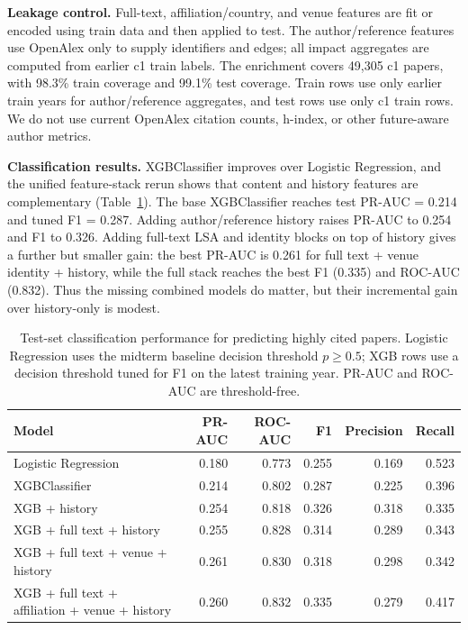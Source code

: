 \textbf{Leakage control.} Full-text, affiliation/country, and venue features
are fit or encoded using train data and then applied to test. The
author/reference features use OpenAlex only to supply identifiers and edges;
all impact aggregates are computed from earlier c1 train labels. The
enrichment covers 49{,}305 c1 papers, with 98.3\% train coverage and 99.1\%
test coverage. Train rows use only earlier train years for author/reference
aggregates, and test rows use only c1 train rows. We do not use current
OpenAlex citation counts, h-index, or other future-aware author metrics.

\textbf{Classification results.} XGBClassifier improves over Logistic
Regression, and the unified feature-stack rerun shows that content and history
features are complementary (Table~\ref{tab:final-xgb-classification}). The
base XGBClassifier reaches test PR-AUC = 0.214 and tuned F1 = 0.287. Adding
author/reference history raises PR-AUC to 0.254 and F1 to 0.326. Adding
full-text LSA and identity blocks on top of history gives a further but
smaller gain: the best PR-AUC is 0.261 for full text + venue identity +
history, while the full stack reaches the best F1 (0.335) and ROC-AUC
(0.832). Thus the missing combined models do matter, but their incremental
gain over history-only is modest.

\begin{table}[t]
\centering
\begin{tabular}{lrrrrr}
\hline
Model & PR-AUC & ROC-AUC & F1 & Precision & Recall \\
\hline
Logistic Regression & 0.180 & 0.773 & 0.255 & 0.169 & 0.523 \\
XGBClassifier & 0.214 & 0.802 & 0.287 & 0.225 & 0.396 \\
XGB + history & 0.254 & 0.818 & 0.326 & 0.318 & 0.335 \\
XGB + full text + history & 0.255 & 0.828 & 0.314 & 0.289 & 0.343 \\
XGB + full text + venue + history & 0.261 & 0.830 & 0.318 & 0.298 & 0.342 \\
XGB + full text + affiliation + venue + history & 0.260 & 0.832 & 0.335 & 0.279 & 0.417 \\
\hline
\end{tabular}
\caption{Test-set classification performance for predicting highly cited
papers. Logistic Regression uses the midterm baseline decision threshold
$p \ge 0.5$; XGB rows use a decision threshold tuned for F1 on the latest
training year. PR-AUC and ROC-AUC are threshold-free.}
\label{tab:final-xgb-classification}
\end{table}

